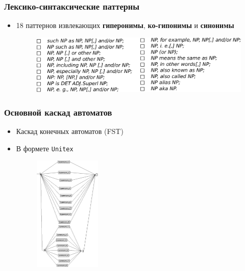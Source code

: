 \documentclass{beamer}
\begin{document}
\begin{frame}
\frametitle{Лексико-синтаксические паттерны}

\begin{itemize}
  \item 18 паттернов извлекающих \textbf{гиперонимы},
  \textbf{ко-гипонимы} и \textbf{синонимы}
\begin{figure}	
	\centering
		\includegraphics[width=1.0\textwidth]{figures/patterns}
	\end{figure}
\end{itemize}

\end{frame}

\begin{frame}
\frametitle{Основной каскад автоматов}

\begin{itemize}
  \item Каскад конечных автоматов (FST)
  \item В формете \texttt{Unitex}
\begin{figure}	
	\centering
		\includegraphics[width=0.3\textwidth]{figures/main-graph}
	\end{figure}
\end{itemize}

\end{frame}
\end{document}
